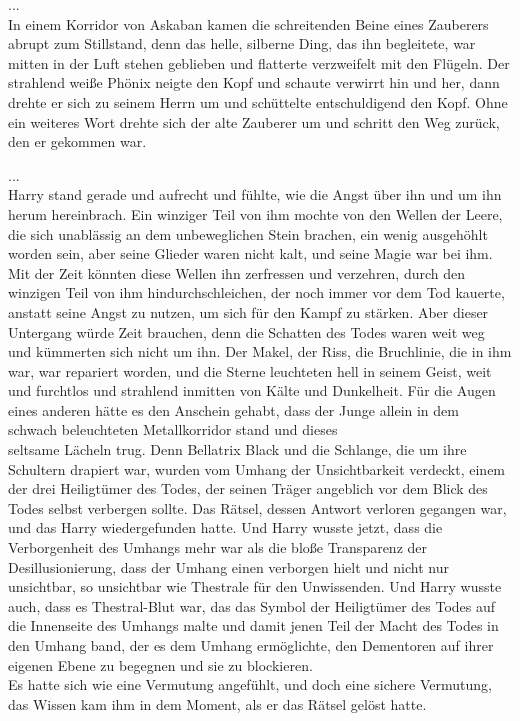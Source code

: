 {...\\ In einem Korridor von Askaban kamen die schreitenden Beine eines Zauberers abrupt zum Stillstand, denn das helle, silberne Ding, das ihn begleitete, war mitten in der Luft stehen geblieben und flatterte verzweifelt mit den Flügeln. Der strahlend weiße Phönix neigte den Kopf und schaute verwirrt hin und her, dann drehte er sich zu seinem Herrn um und schüttelte entschuldigend den Kopf. Ohne ein weiteres Wort drehte sich der alte Zauberer um und schritt den Weg zurück, den er gekommen war.

...\\ Harry stand gerade und aufrecht und fühlte, wie die Angst über ihn und um ihn herum hereinbrach. Ein winziger Teil von ihm mochte von den Wellen der Leere, die sich unablässig an dem unbeweglichen Stein brachen, ein wenig ausgehöhlt worden sein, aber seine Glieder waren nicht kalt, und seine Magie war bei ihm. Mit der Zeit könnten diese Wellen ihn zerfressen und verzehren, durch den winzigen Teil von ihm hindurchschleichen, der noch immer vor dem Tod kauerte, anstatt seine Angst zu nutzen, um sich für den Kampf zu stärken. Aber dieser Untergang würde Zeit brauchen, denn die Schatten des Todes waren weit weg und kümmerten sich nicht um ihn. Der Makel, der Riss, die Bruchlinie, die in ihm war, war repariert worden, und die Sterne leuchteten hell in seinem Geist, weit und furchtlos und strahlend inmitten von Kälte und Dunkelheit. Für die Augen eines anderen hätte es den Anschein gehabt, dass der Junge allein in dem schwach beleuchteten Metallkorridor stand und dieses\\ seltsame Lächeln trug. Denn Bellatrix Black und die Schlange, die um ihre Schultern drapiert war, wurden vom Umhang der Unsichtbarkeit verdeckt, einem der drei Heiligtümer des Todes, der seinen Träger angeblich vor dem Blick des Todes selbst verbergen sollte. Das Rätsel, dessen Antwort verloren gegangen war, und das Harry wiedergefunden hatte. Und Harry wusste jetzt, dass die Verborgenheit des Umhangs mehr war als die bloße Transparenz der Desillusionierung, dass der Umhang einen verborgen hielt und nicht nur unsichtbar, so unsichtbar wie Thestrale für den Unwissenden. Und Harry wusste auch, dass es Thestral-Blut war, das das Symbol der Heiligtümer des Todes auf die Innenseite des Umhangs malte und damit jenen Teil der Macht des Todes in den Umhang band, der es dem Umhang ermöglichte, den Dementoren auf ihrer eigenen Ebene zu begegnen und sie zu blockieren.\\ Es hatte sich wie eine Vermutung angefühlt, und doch eine sichere Vermutung, das Wissen kam ihm in dem Moment, als er das Rätsel gelöst hatte.

}
